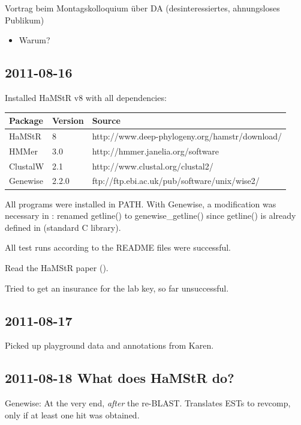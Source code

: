 Vortrag beim Montagskolloquium über DA (desinteressiertes, ahnungsloses
Publikum)

\begin{itemize}
	\item Warum?
\end{itemize}

\subsection*{2011-08-16}

Installed HaMStR v8 with all dependencies:

\begin{table}[h]
	\begin{tabular}{l l l}
		\textbf{Package} & \textbf{Version} & \textbf{Source}\\
		\hline
		HaMStR   & 8     & http://www.deep-phylogeny.org/hamstr/download/ \\
		HMMer    & 3.0	 & http://hmmer.janelia.org/software \\
		ClustalW & 2.1   & http://www.clustal.org/clustal2/ \\
		Genewise & 2.2.0 & ftp://ftp.ebi.ac.uk/pub/software/unix/wise2/ \\
	\end{tabular}
\end{table}

All programs were installed in PATH. With Genewise, a modification was
necessary in : renamed getline() to genewise\_getline()
since getline() is already defined in  (standard C library).

All test runs according to the README files were successful.

Read the HaMStR paper (\cite{Ebersberger2009}).

Tried to get an insurance for the lab key, so far unsuccessful.

\subsection*{2011-08-17}

Picked up playground data and annotations from Karen.

\subsection*{2011-08-18 What does HaMStR do?}

Genewise: At the very end, \emph{after} the re-BLAST. Translates ESTs to
revcomp, only if at least one hit was obtained.

